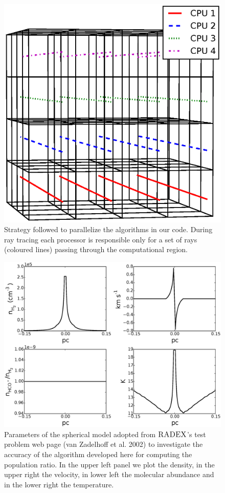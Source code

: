 \documentclass{mn2e}
\begin{document}
\begin{figure}
\includegraphics[width=1.02\columnwidth, clip]{parallelization.eps}
\caption{Strategy followed to parallelize the algorithms in our code. During ray tracing each processor is responsible only for a set of rays (coloured lines) passing through the computational region. 
\label{parallelization}}
\end{figure}

\begin{figure}
\includegraphics[width=1.0\columnwidth, clip]{model_parameters_for_poprat.eps}
\caption{Parameters of the spherical model adopted from $\textsc{RADEX}$'s test problem web page (van Zadelhoff et al. 2002) to investigate the accuracy of the algorithm developed here for computing the population ratio. In the upper left panel we plot the density, in the upper right the velocity, in lower left the molecular abundance and in the lower right the temperature.
\label{model_for_populations}}
\end{figure} 
\end{document}
